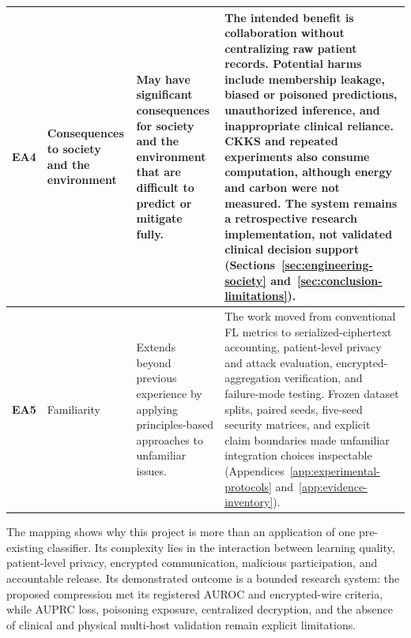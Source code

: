 \begin{longtable}{|p{0.9cm}|p{2.8cm}|p{3.8cm}|p{5.2cm}|}
\textbf{EA4} &
Consequences to society and the environment &
May have significant consequences for society and the environment that are difficult to predict or mitigate fully. &
The intended benefit is collaboration without centralizing raw patient records. Potential harms include membership leakage, biased or poisoned predictions, unauthorized inference, and inappropriate clinical reliance. CKKS and repeated experiments also consume computation, although energy and carbon were not measured. The system remains a retrospective research implementation, not validated clinical decision support (Sections~\ref{sec:engineering-society} and~\ref{sec:conclusion-limitations}).\\
\hline

\textbf{EA5} &
Familiarity &
Extends beyond previous experience by applying principles-based approaches to unfamiliar issues. &
The work moved from conventional FL metrics to serialized-ciphertext accounting, patient-level privacy and attack evaluation, encrypted-aggregation verification, and failure-mode testing. Frozen dataset splits, paired seeds, five-seed security matrices, and explicit claim boundaries made unfamiliar integration choices inspectable (Appendices~\ref{app:experimental-protocols} and~\ref{app:evidence-inventory}).\\
\hline
\end{longtable}

\endgroup

The mapping shows why this project is more than an application of one pre-existing classifier. Its complexity lies in the interaction between learning quality, patient-level privacy, encrypted communication, malicious participation, and accountable release. Its demonstrated outcome is a bounded research system: the proposed compression met its registered AUROC and encrypted-wire criteria, while AUPRC loss, poisoning exposure, centralized decryption, and the absence of clinical and physical multi-host validation remain explicit limitations.
